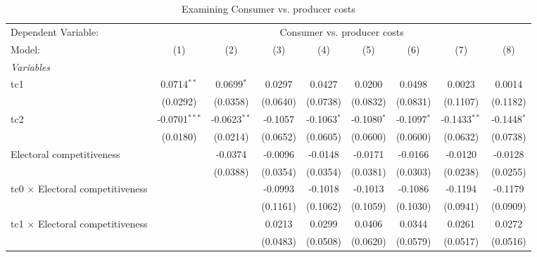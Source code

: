 
\begin{table}[htbp]
   \caption{Examining Consumer vs. producer costs}
   \centering
   \begin{tabular}{lcccccccc}
      \tabularnewline \midrule \midrule
      Dependent Variable: & \multicolumn{8}{c}{Consumer vs. producer costs}\\
      Model:                                  & (1)             & (2)            & (3)      & (4)           & (5)           & (6)           & (7)            & (8)\\  
      \midrule
      \emph{Variables}\\
      tc1                                     & 0.0714$^{**}$   & 0.0699$^{*}$   & 0.0297   & 0.0427        & 0.0200        & 0.0498        & 0.0023         & 0.0014\\   
                                              & (0.0292)        & (0.0358)       & (0.0640) & (0.0738)      & (0.0832)      & (0.0831)      & (0.1107)       & (0.1182)\\   
      tc2                                     & -0.0701$^{***}$ & -0.0623$^{**}$ & -0.1057  & -0.1063$^{*}$ & -0.1080$^{*}$ & -0.1097$^{*}$ & -0.1433$^{**}$ & -0.1448$^{*}$\\   
                                              & (0.0180)        & (0.0214)       & (0.0652) & (0.0605)      & (0.0600)      & (0.0600)      & (0.0632)       & (0.0738)\\   
      Electoral competitiveness               &                 & -0.0374        & -0.0096  & -0.0148       & -0.0171       & -0.0166       & -0.0120        & -0.0128\\   
                                              &                 & (0.0388)       & (0.0354) & (0.0354)      & (0.0381)      & (0.0303)      & (0.0238)       & (0.0255)\\   
      tc0 $\times$ Electoral competitiveness  &                 &                & -0.0993  & -0.1018       & -0.1013       & -0.1086       & -0.1194        & -0.1179\\   
                                              &                 &                & (0.1161) & (0.1062)      & (0.1059)      & (0.1030)      & (0.0941)       & (0.0909)\\   
      tc1 $\times$ Electoral competitiveness  &                 &                & 0.0213   & 0.0299        & 0.0406        & 0.0344        & 0.0261         & 0.0272\\   
                                              &                 &                & (0.0483) & (0.0508)      & (0.0620)      & (0.0579)      & (0.0517)       & (0.0516)\\   

\end{tabular}
\end{table}
